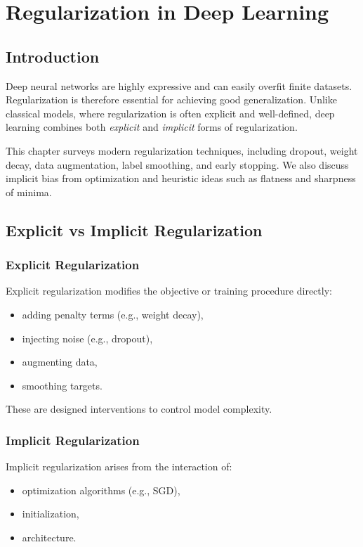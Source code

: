 \chapter{Regularization in Deep Learning}

\section{Introduction}

Deep neural networks are highly expressive and can easily overfit finite datasets. Regularization is therefore essential for achieving good generalization. Unlike classical models, where regularization is often explicit and well-defined, deep learning combines both \emph{explicit} and \emph{implicit} forms of regularization.

This chapter surveys modern regularization techniques, including dropout, weight decay, data augmentation, label smoothing, and early stopping. We also discuss implicit bias from optimization and heuristic ideas such as flatness and sharpness of minima.

\section{Explicit vs Implicit Regularization}

\subsection{Explicit Regularization}

Explicit regularization modifies the objective or training procedure directly:
\begin{itemize}
    \item adding penalty terms (e.g., weight decay),
    \item injecting noise (e.g., dropout),
    \item augmenting data,
    \item smoothing targets.
\end{itemize}

These are designed interventions to control model complexity.

\subsection{Implicit Regularization}

Implicit regularization arises from the interaction of:
\begin{itemize}
    \item optimization algorithms (e.g., SGD),
    \item initialization,
    \item architecture.
\end{itemize}

